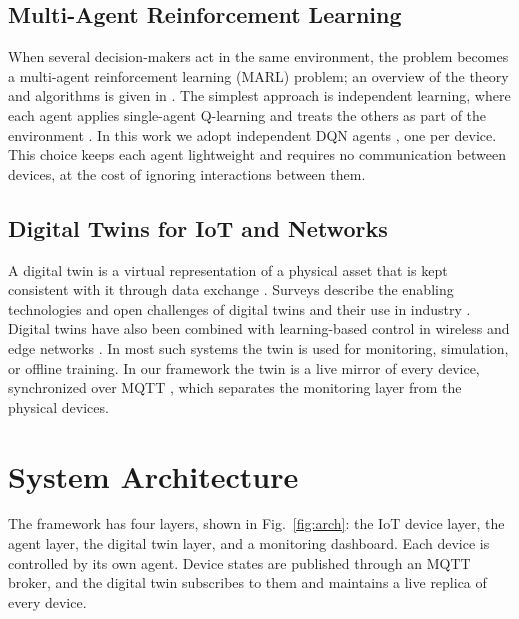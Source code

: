 \documentclass[conference]{IEEEtran}
\begin{document}
\subsection{Multi-Agent Reinforcement Learning}
When several decision-makers act in the same environment, the problem becomes a multi-agent reinforcement learning (MARL) problem; an overview of the theory and algorithms is given in \cite{zhang2021marl}. The simplest approach is independent learning, where each agent applies single-agent Q-learning and treats the others as part of the environment \cite{tan1993}. In this work we adopt independent DQN agents \cite{mnih2015}, one per device. This choice keeps each agent lightweight and requires no communication between devices, at the cost of ignoring interactions between them.

\subsection{Digital Twins for IoT and Networks}
A digital twin is a virtual representation of a physical asset that is kept consistent with it through data exchange \cite{grieves2017}. Surveys describe the enabling technologies and open challenges of digital twins \cite{fuller2020} and their use in industry \cite{tao2019}. Digital twins have also been combined with learning-based control in wireless and edge networks \cite{lu2021}. In most such systems the twin is used for monitoring, simulation, or offline training. In our framework the twin is a live mirror of every device, synchronized over MQTT \cite{mqtt}, which separates the monitoring layer from the physical devices.

\section{System Architecture}
\label{sec:system}

The framework has four layers, shown in Fig.~\ref{fig:arch}: the IoT device layer, the agent layer, the digital twin layer, and a monitoring dashboard. Each device is controlled by its own agent. Device states are published through an MQTT broker, and the digital twin subscribes to them and maintains a live replica of every device.
\end{document}
